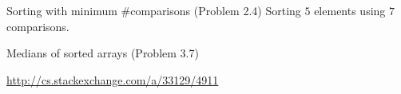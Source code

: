 \begin{frame}{Sorting with minimum \#comparisons (Problem 2.4)}
  Sorting $5$ elements using $7$ comparisons.
\end{frame}
\begin{frame}{Medians of sorted arrays (Problem 3.7)}
  \centerline{\url{http://cs.stackexchange.com/a/33129/4911}}
\end{frame}

